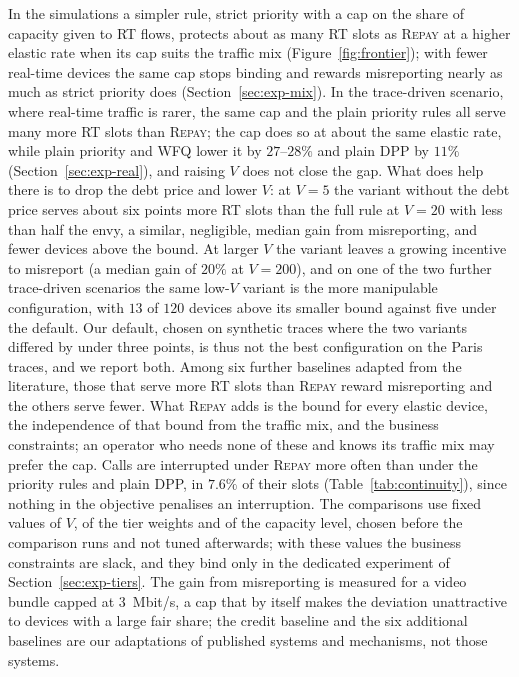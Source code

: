 \documentclass[preprint,11pt]{elsarticle}
\theoremstyle{definition}
\theoremstyle{remark}
\newcommand{\repay}{\textsc{Repay}}
\begin{document}
In the simulations a simpler rule, strict priority with a cap on the share of capacity given to RT flows, protects about as many RT slots as \repay{} at a higher elastic rate when its cap suits the traffic mix (Figure~\ref{fig:frontier}); with fewer real-time devices the same cap stops binding and rewards misreporting nearly as much as strict priority does (Section~\ref{sec:exp-mix}). In the trace-driven scenario, where real-time traffic is rarer, the same cap and the plain priority rules all serve many more RT slots than \repay{}; the cap does so at about the same elastic rate, while plain priority and \textsc{WFQ} lower it by $27$--$28\%$ and plain DPP by $11\%$ (Section~\ref{sec:exp-real}), and raising $V$ does not close the gap. What does help there is to drop the debt price and lower $V$: at $V=5$ the variant without the debt price serves about six points more RT slots than the full rule at $V=20$ with less than half the envy, a similar, negligible, median gain from misreporting, and fewer devices above the bound. At larger $V$ the variant leaves a growing incentive to misreport (a median gain of $20\%$ at $V=200$), and on one of the two further trace-driven scenarios the same low-$V$ variant is the more manipulable configuration, with $13$ of $120$ devices above its smaller bound against five under the default. Our default, chosen on synthetic traces where the two variants differed by under three points, is thus not the best configuration on the Paris traces, and we report both. Among six further baselines adapted from the literature, those that serve more RT slots than \repay{} reward misreporting and the others serve fewer. What \repay{} adds is the bound for every elastic device, the independence of that bound from the traffic mix, and the business constraints; an operator who needs none of these and knows its traffic mix may prefer the cap.
Calls are interrupted under \repay{} more often than under the priority rules and plain DPP, in $7.6\%$ of their slots (Table~\ref{tab:continuity}), since nothing in the objective penalises an interruption.
The comparisons use fixed values of $V$, of the tier weights and of the capacity level, chosen before the comparison runs and not tuned afterwards; with these values the business constraints are slack, and they bind only in the dedicated experiment of Section~\ref{sec:exp-tiers}.
The gain from misreporting is measured for a video bundle capped at $3$~Mbit/s, a cap that by itself makes the deviation unattractive to devices with a large fair share; the credit baseline and the six additional baselines are our adaptations of published systems and mechanisms, not those systems.
\end{document}
